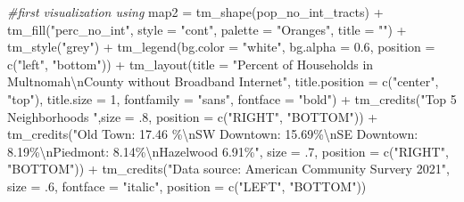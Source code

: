\documentclass[
]{article}
\newenvironment{Shaded}{\begin{snugshade}}{\end{snugshade}}
\newcommand{\AttributeTok}[1]{\textcolor[rgb]{0.77,0.63,0.00}{#1}}
\newcommand{\CommentTok}[1]{\textcolor[rgb]{0.56,0.35,0.01}{\textit{#1}}}
\newcommand{\DecValTok}[1]{\textcolor[rgb]{0.00,0.00,0.81}{#1}}
\newcommand{\FloatTok}[1]{\textcolor[rgb]{0.00,0.00,0.81}{#1}}
\newcommand{\FunctionTok}[1]{\textcolor[rgb]{0.00,0.00,0.00}{#1}}
\newcommand{\NormalTok}[1]{#1}
\newcommand{\OtherTok}[1]{\textcolor[rgb]{0.56,0.35,0.01}{#1}}
\newcommand{\SpecialCharTok}[1]{\textcolor[rgb]{0.00,0.00,0.00}{#1}}
\newcommand{\StringTok}[1]{\textcolor[rgb]{0.31,0.60,0.02}{#1}}
\begin{document}
\begin{Shaded}
\begin{Highlighting}[]
\CommentTok{\#first visualization using}
\NormalTok{map2 }\OtherTok{=} \FunctionTok{tm\_shape}\NormalTok{(pop\_no\_int\_tracts) }\SpecialCharTok{+} 
  \FunctionTok{tm\_fill}\NormalTok{(}\StringTok{"perc\_no\_int"}\NormalTok{, }\AttributeTok{style =} \StringTok{"cont"}\NormalTok{, }\AttributeTok{palette =} \StringTok{"Oranges"}\NormalTok{, }\AttributeTok{title =} \StringTok{""}\NormalTok{) }\SpecialCharTok{+} 
  \FunctionTok{tm\_style}\NormalTok{(}\StringTok{"grey"}\NormalTok{) }\SpecialCharTok{+} 
  \FunctionTok{tm\_legend}\NormalTok{(}\AttributeTok{bg.color =} \StringTok{"white"}\NormalTok{, }\AttributeTok{bg.alpha =} \FloatTok{0.6}\NormalTok{, }\AttributeTok{position =} \FunctionTok{c}\NormalTok{(}\StringTok{"left"}\NormalTok{, }\StringTok{"bottom"}\NormalTok{)) }\SpecialCharTok{+} 
  \FunctionTok{tm\_layout}\NormalTok{(}\AttributeTok{title =} \StringTok{"Percent of Households in Multnomah}\SpecialCharTok{\textbackslash{}n}\StringTok{County without Broadband Internet"}\NormalTok{,}
            \AttributeTok{title.position =} \FunctionTok{c}\NormalTok{(}\StringTok{"center"}\NormalTok{, }\StringTok{"top"}\NormalTok{),}
            \AttributeTok{title.size =} \DecValTok{1}\NormalTok{,}
            \AttributeTok{fontfamily =} \StringTok{"sans"}\NormalTok{, }\AttributeTok{fontface =} \StringTok{"bold"}\NormalTok{) }\SpecialCharTok{+}   
  \FunctionTok{tm\_credits}\NormalTok{(}\StringTok{"Top 5 Neighborhoods    "}\NormalTok{,}\AttributeTok{size =}\NormalTok{ .}\DecValTok{8}\NormalTok{, }\AttributeTok{position =} \FunctionTok{c}\NormalTok{(}\StringTok{"RIGHT"}\NormalTok{, }\StringTok{"BOTTOM"}\NormalTok{)) }\SpecialCharTok{+} 
  \FunctionTok{tm\_credits}\NormalTok{(}\StringTok{"Old Town: 17.46 \%}\SpecialCharTok{\textbackslash{}n}\StringTok{SW Downtown: 15.69\%}\SpecialCharTok{\textbackslash{}n}\StringTok{SE Downtown: 8.19\%}\SpecialCharTok{\textbackslash{}n}\StringTok{Piedmont: 8.14\%}\SpecialCharTok{\textbackslash{}n}\StringTok{Hazelwood 6.91\%"}\NormalTok{, }\AttributeTok{size =}\NormalTok{ .}\DecValTok{7}\NormalTok{, }\AttributeTok{position =} \FunctionTok{c}\NormalTok{(}\StringTok{"RIGHT"}\NormalTok{, }\StringTok{"BOTTOM"}\NormalTok{)) }\SpecialCharTok{+} 
  \FunctionTok{tm\_credits}\NormalTok{(}\StringTok{"Data source: American Community Survery 2021"}\NormalTok{, }\AttributeTok{size =}\NormalTok{ .}\DecValTok{6}\NormalTok{, }\AttributeTok{fontface =} \StringTok{"italic"}\NormalTok{, }\AttributeTok{position =} \FunctionTok{c}\NormalTok{(}\StringTok{"LEFT"}\NormalTok{, }\StringTok{"BOTTOM"}\NormalTok{)) }


\end{Highlighting}
\end{Shaded}
\end{document}
